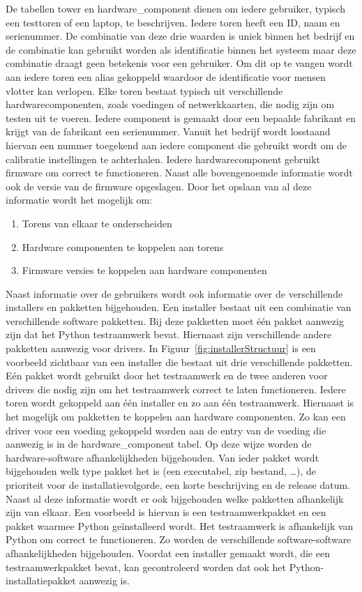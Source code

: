 De tabellen tower en hardware\_component dienen om iedere gebruiker, typisch een testtoren of een laptop, te beschrijven.
Iedere toren heeft een ID, naam en serienummer.
De combinatie van deze drie waarden is uniek binnen het bedrijf en de combinatie kan gebruikt worden als identificatie binnen het systeem maar deze combinatie draagt geen betekenis voor een gebruiker.
Om dit op te vangen wordt aan iedere toren een alias gekoppeld waardoor de identificatie voor mensen vlotter kan verlopen.
Elke toren bestaat typisch uit verschillende hardwarecomponenten, zoals voedingen of netwerkkaarten, die nodig zijn om testen uit te voeren.
Iedere component is gemaakt door een bepaalde fabrikant en krijgt van de fabrikant een serienummer.
Vanuit het bedrijf wordt losstaand hiervan een nummer toegekend aan iedere component die gebruikt wordt om de calibratie instellingen te achterhalen.
Iedere hardwarecomponent gebruikt firmware om correct te functioneren.
Naast alle bovengenoemde informatie wordt ook de versie van de firmware opgeslagen.
Door het opslaan van al deze informatie wordt het mogelijk om:
\begin{enumerate}
\item Torens van elkaar te onderscheiden
\item Hardware componenten te koppelen aan torens
\item Firmware versies te koppelen aan hardware componenten
\end{enumerate}

Naast informatie over de gebruikers wordt ook informatie over de verschillende installers en pakketten bijgehouden.
Een installer bestaat uit een combinatie van verschillende software pakketten.
Bij deze pakketten moet één pakket aanwezig zijn dat het Python testraamwerk bevat.
Hiernaast zijn verschillende andere pakketten aanwezig voor drivers.
In Figuur~\vref{fig:installerStructuur} is een voorbeeld zichtbaar van een installer die bestaat uit drie verschillende pakketten.
Eén pakket wordt gebruikt door het testraamwerk en de twee anderen voor drivers die nodig zijn om het testraamwerk correct te laten functioneren.
Iedere toren wordt gekoppeld aan één installer en zo aan één testraamwerk.
Hiernaast is het mogelijk om pakketten te koppelen aan hardware componenten.
Zo kan een driver voor een voeding gekoppeld worden aan de entry van de voeding die aanwezig is in de hardware\_component tabel.
Op deze wijze worden de hardware-software afhankelijkheden bijgehouden.
Van ieder pakket wordt bijgehouden welk type pakket het is (een executabel, zip bestand, \ldots), de prioriteit voor de installatievolgorde, een korte beschrijving en de release datum.
Naast al deze informatie wordt er ook bijgehouden welke pakketten afhankelijk zijn van elkaar.
Een voorbeeld is hiervan is een testraamwerkpakket en een pakket waarmee Python geïnstalleerd wordt.
Het testraamwerk is afhankelijk van Python om correct te functioneren.
Zo worden de verschillende software-software afhankelijkheden bijgehouden.
Voordat een installer gemaakt wordt, die een testraamwerkpakket bevat, kan gecontroleerd worden dat ook het Python-installatiepakket aanwezig is.

